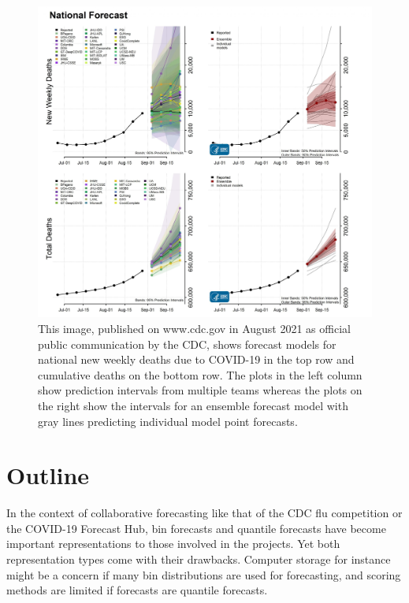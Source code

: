 \documentclass[11pt,notitlepage]{isuthesis}
\begin{document}
\begin{figure}[htbp]
\centerline{\includegraphics[scale=.24]{Images/8_30_21_cvd_deaths.jpeg}}
\begin{center}
\begin{minipage}{10cm}
\captionsetup{font=scriptsize}
\caption[Official CDC COVID-19 deaths report August 2021]{This image, 
published on www.cdc.gov in August 2021 as official public communication 
by the CDC, shows forecast models for national new weekly deaths due to COVID-19 
in the top row and cumulative deaths on the bottom row. The plots in the left 
column show prediction intervals from multiple teams whereas the plots on the 
right show the intervals for an ensemble forecast model with gray lines
predicting individual model point forecasts.}
\label{fig:cdcoff}
\end{minipage}
\end{center}
\end{figure}

\section{Outline}
In the context of collaborative forecasting like that of the CDC flu competition
or the COVID-19 Forecast Hub, bin forecasts and quantile forecasts have become
important representations to those involved in the projects. Yet both 
representation types come 
with their drawbacks. Computer
storage for instance might be a concern if many bin distributions are used for 
forecasting, 
and scoring methods are limited if forecasts are quantile forecasts.
\end{document}
